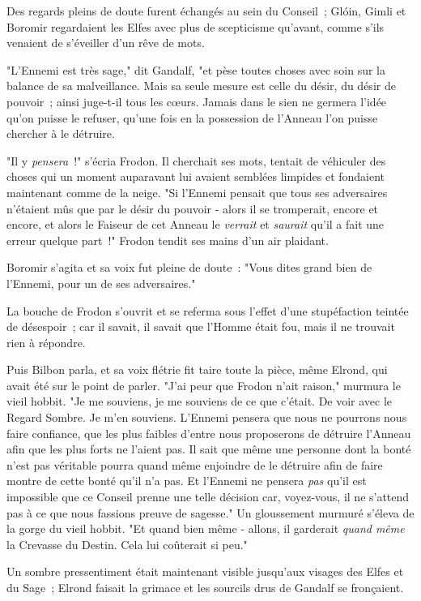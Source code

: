 Des regards pleins de doute furent échangés au sein du Conseil~; Glóin, Gimli et Boromir regardaient les Elfes avec plus de scepticisme qu'avant, comme s'ils venaient de s'éveiller d'un rêve de mots.

"L'Ennemi est très sage," dit Gandalf, "et pèse toutes choses avec soin sur la balance de sa malveillance. Mais sa seule mesure est celle du désir, du désir de pouvoir~; ainsi juge-t-il tous les cœurs. Jamais dans le sien ne germera l'idée qu'on puisse le refuser, qu'une fois en la possession de l'Anneau l'on puisse chercher à le détruire.

"Il y \emph{pensera}~!" s'écria Frodon. Il cherchait ses mots, tentait de véhiculer des choses qui un moment auparavant lui avaient semblées limpides et fondaient maintenant comme de la neige. "Si l'Ennemi pensait que tous ses adversaires n'étaient mûs que par le désir du pouvoir - alors il se tromperait, encore et encore, et alors le Faiseur de cet Anneau le \emph{verrait} et \emph{saurait} qu'il a fait une erreur quelque part~!" Frodon tendit ses mains d'un air plaidant.

Boromir s'agita et sa voix fut pleine de doute~: "Vous dites grand bien de l'Ennemi, pour un de ses adversaires."

La bouche de Frodon s'ouvrit et se referma sous l'effet d'une stupéfaction teintée de désespoir~; car il savait, il savait que l'Homme était fou, mais il ne trouvait rien à répondre.

Puis Bilbon parla, et sa voix flétrie fit taire toute la pièce, même Elrond, qui avait été sur le point de parler. "J'ai peur que Frodon n'ait raison," murmura le vieil hobbit. "Je me souviens, je me souviens de ce que c'était. De voir avec le Regard Sombre. Je m'en souviens. L'Ennemi pensera que nous ne pourrons nous faire confiance, que les plus faibles d'entre nous proposerons de détruire l'Anneau afin que les plus forts ne l'aient pas. Il sait que même une personne dont la bonté n'est pas véritable pourra quand même enjoindre de le détruire afin de faire montre de cette bonté qu'il n'a pas. Et l'Ennemi ne pensera \emph{pas} qu'il est impossible que ce Conseil prenne une telle décision car, voyez-vous, il ne s'attend pas à ce que nous fassions preuve de sagesse." Un gloussement murmuré s'éleva de la gorge du vieil hobbit. "Et quand bien même - allons, il garderait \emph{quand même} la Crevasse du Destin. Cela lui coûterait si peu."

Un sombre pressentiment était maintenant visible jusqu'aux visages des Elfes et du Sage~; Elrond faisait la grimace et les sourcils drus de Gandalf se fronçaient.

